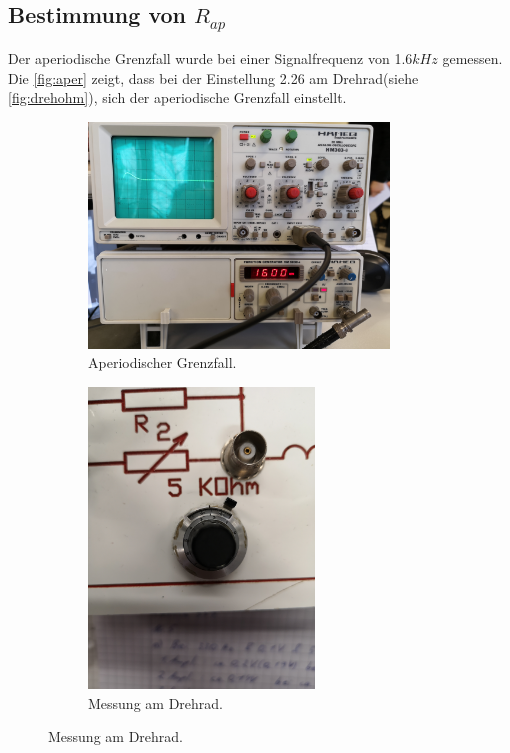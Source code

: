 \subsection{Bestimmung von \(R_{ap}\)}
Der aperiodische Grenzfall wurde bei einer Signalfrequenz von 1.6\(kHz\) gemessen.\\
Die \autoref{fig:aper} zeigt, dass bei der Einstellung 2.26 am Drehrad(siehe \autoref{fig:drehohm}), sich der aperiodische Grenzfall einstellt.\\
\begin{figure}
  \centering
  \begin{subfigure}{0.9\textwidth}
    \centering
    \includegraphics[height=6cm]{content/aperiode.jpg}
    \caption{Aperiodischer Grenzfall.}
    \label{fig:aper}
  \end{subfigure}
  \begin{subfigure}{0.9\textwidth}
    \centering
    \includegraphics[height=8cm]{content/aperoiode_ohm.jpg}
    \caption{Messung am Drehrad.}
    \label{fig:drehohm}
  \end{subfigure}
\end{figure}

